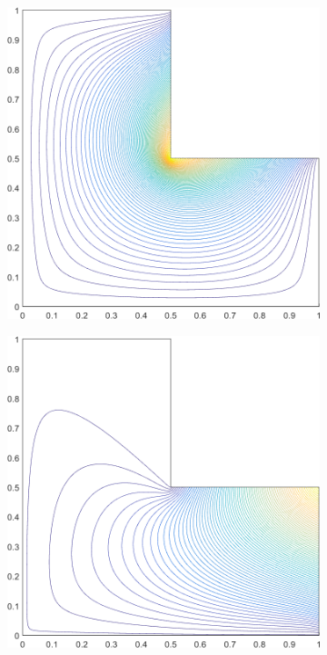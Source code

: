 \begin{figure}
\begin{subfigure}[b]{0.39\textwidth}
		\caption{}
	\end{subfigure}
	\vfill
	\begin{subfigure}[b]{0.39\textwidth}
		\centering
		\includegraphics[width=\textwidth]{figures/sec_BF/L-domain_MV1_contour_b4.png}
		\caption{}
	\end{subfigure}
	\hspace{1.5cm}
	\begin{subfigure}[b]{0.39\textwidth}
		\centering
		\includegraphics[width=\textwidth]{figures/sec_BF/L-domain_MV1_contour_b3.png}

\end{subfigure}
\end{figure}

